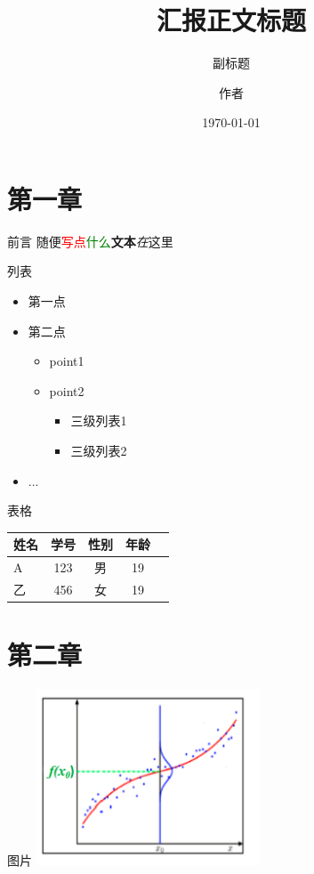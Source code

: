 \documentclass{beamer}
\title{汇报正文标题}
\subtitle{副标题}
\author{作者}
\date{\today}
\begin{document}
\maketitle

\section{第一章}
\begin{frame}{前言}
    \centering
    随便\textcolor{red}{写点}\textcolor{green}{什么}\textbf{文本}\textit{在}这里
\end{frame}

\begin{frame}{列表}
    \begin{itemize}
        \item 第一点
        \item 第二点
        \begin{itemize}
            \item point1
            \item point2
            \begin{itemize}
                \item 三级列表1
                \item 三级列表2
            \end{itemize}
        \end{itemize}
        \item ...
    \end{itemize}
\end{frame}

\begin{frame}{表格}
    \begin{table}
        \centering
        \begin{tabular}{lcccc}
            \toprule
            姓名 & 学号 & 性别 & 年龄 \\
            \midrule
            A & 123 & 男 & 19 \\
            乙 & 456 & 女 & 19 \\
            \bottomrule
        \end{tabular}
    \end{table}
\end{frame}

\section{第二章}
\begin{frame}{图片}
    \centering
    \includegraphics[width=0.5\textwidth]{assets/example/6.2.1.png}
\end{frame}
\end{document}
